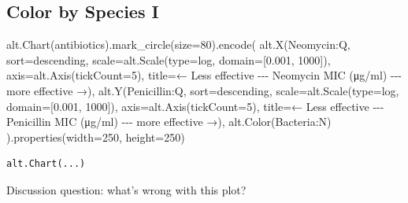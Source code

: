 \documentclass[
  letterpaper,
  DIV=11,
  numbers=noendperiod]{scrartcl}
\newenvironment{Shaded}{\begin{snugshade}}{\end{snugshade}}
\newcommand{\BuiltInTok}[1]{\textcolor[rgb]{0.00,0.23,0.31}{#1}}
\newcommand{\DecValTok}[1]{\textcolor[rgb]{0.68,0.00,0.00}{#1}}
\newcommand{\FloatTok}[1]{\textcolor[rgb]{0.68,0.00,0.00}{#1}}
\newcommand{\NormalTok}[1]{\textcolor[rgb]{0.00,0.23,0.31}{#1}}
\newcommand{\OperatorTok}[1]{\textcolor[rgb]{0.37,0.37,0.37}{#1}}
\newcommand{\StringTok}[1]{\textcolor[rgb]{0.13,0.47,0.30}{#1}}
\begin{document}
\subsection{Color by Species I}\label{color-by-species-i}

\begin{Shaded}
\begin{Highlighting}[]
\NormalTok{alt.Chart(antibiotics).mark\_circle(size}\OperatorTok{=}\DecValTok{80}\NormalTok{).encode(}
\NormalTok{    alt.X(}\StringTok{\textquotesingle{}Neomycin:Q\textquotesingle{}}\NormalTok{,}
\NormalTok{          sort}\OperatorTok{=}\StringTok{\textquotesingle{}descending\textquotesingle{}}\NormalTok{,}
\NormalTok{          scale}\OperatorTok{=}\NormalTok{alt.Scale(}\BuiltInTok{type}\OperatorTok{=}\StringTok{\textquotesingle{}log\textquotesingle{}}\NormalTok{, domain}\OperatorTok{=}\NormalTok{[}\FloatTok{0.001}\NormalTok{, }\DecValTok{1000}\NormalTok{]),}
\NormalTok{          axis}\OperatorTok{=}\NormalTok{alt.Axis(tickCount}\OperatorTok{=}\DecValTok{5}\NormalTok{),}
\NormalTok{          title}\OperatorTok{=}\StringTok{\textquotesingle{}← Less effective {-}{-}{-} Neomycin MIC (μg/ml) {-}{-}{-} more effective →\textquotesingle{}}\NormalTok{),}
\NormalTok{    alt.Y(}\StringTok{\textquotesingle{}Penicillin:Q\textquotesingle{}}\NormalTok{,}
\NormalTok{          sort}\OperatorTok{=}\StringTok{\textquotesingle{}descending\textquotesingle{}}\NormalTok{,}
\NormalTok{          scale}\OperatorTok{=}\NormalTok{alt.Scale(}\BuiltInTok{type}\OperatorTok{=}\StringTok{\textquotesingle{}log\textquotesingle{}}\NormalTok{, domain}\OperatorTok{=}\NormalTok{[}\FloatTok{0.001}\NormalTok{, }\DecValTok{1000}\NormalTok{]),}
\NormalTok{          axis}\OperatorTok{=}\NormalTok{alt.Axis(tickCount}\OperatorTok{=}\DecValTok{5}\NormalTok{),}
\NormalTok{          title}\OperatorTok{=}\StringTok{\textquotesingle{}← Less effective {-}{-}{-} Penicillin MIC (μg/ml) {-}{-}{-} more effective →\textquotesingle{}}\NormalTok{),}
\NormalTok{    alt.Color(}\StringTok{\textquotesingle{}Bacteria:N\textquotesingle{}}\NormalTok{)}
\NormalTok{).properties(width}\OperatorTok{=}\DecValTok{250}\NormalTok{, height}\OperatorTok{=}\DecValTok{250}\NormalTok{)}
\end{Highlighting}
\end{Shaded}

\begin{verbatim}
alt.Chart(...)
\end{verbatim}

Discussion question: what's wrong with this plot?
\end{document}

